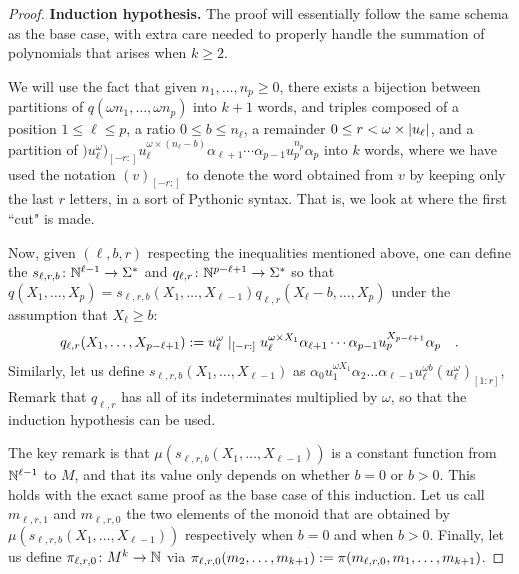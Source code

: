 \begin{proof}
    \textbf{Induction hypothesis.}
    The proof will essentially follow the same schema as the base case,
    with extra care needed to properly handle the summation of polynomials
    that arises when $k \geq 2$.

    We will use the fact that given $n_1, \dots, n_p \geq 0$,
    there exists a bijection between
    partitions of $q(\omega n_1, \dots, \omega n_p)$
    into $k+1$ words, and 
    triples composed of
    a position  $1 \leq \ell \leq p$,
    a ratio     $0 \leq b \leq n_\ell$,
    a remainder $0 \leq r < \omega \times \card{u_\ell}$,
    and a partition of
    $)u_\ell^\omega)_{[-r:]} u_\ell^{\omega \times (n_\ell - b)}
    \alpha_{\ell+1} \cdots \alpha_{p-1} u_p^{n_p} \alpha_{p}$
    into $k$ words,
    where we have used the notation 
    $(v)_{[-r:]}$ to denote the word obtained from $v$ 
    by keeping only the last $r$ letters, in a sort of Pythonic syntax.
    That is, we look at where the first ``cut" is made.

    Now, given $(\ell, b, r)$ respecting the inequalities 
    mentioned above,
    one can define the 
    $s_{\ell,r,b} \colon \mathbb{N}^{\ell - 1} \to \Sigma^*$
    and
    $q_{\ell,r} \colon \mathbb{N}^{p - \ell + 1} \to \Sigma^*$
    so that
    $q(X_1, \dots, X_p) = s_{\ell,r,b}(X_1, \dots, X_{\ell-1}) 
    q_{\ell, r}(X_{\ell} - b, \dots, X_p)$
    under the assumption that $X_\ell \geq b$:
    \begin{equation*}
        q_{\ell,r}(X_{1}, \dots, X_{p - \ell + 1})
        \mathrel{:=}
        u_\ell^\omega\mid_{[-r:]} u_\ell^{\omega \times X_1}
        \alpha_{\ell+1} \cdots \alpha_{p-1} u_p^{X_{p - \ell + 1}} \alpha_{p}
        \quad .
    \end{equation*}
    Similarly, let us define 
    $s_{\ell, r, b}(X_1, \dots, X_{\ell - 1})$
    as 
    $\alpha_0 u_1^{\omega X_1} \alpha_2 \dots \alpha_{\ell - 1} 
    u_\ell^{\omega b} (u_{\ell}^\omega)_{[1:r]}$,
    Remark that $q_{\ell,r}$ has all of its indeterminates
    multiplied by $\omega$, so that the induction hypothesis 
    can be used.

    The key remark is that $\mu(s_{\ell,r,b}(X_1, \dots, X_{\ell - 1}))$ is a
    constant function from $\mathbb{N}^{\ell-1}$ to $M$, and that its value
    only depends on whether $b = 0$ or $b > 0$.
    This holds with
    the exact same proof as the base case of this induction. Let us call
    $m_{\ell,r,1}$ and $m_{\ell,r,0}$ the two elements of the monoid that are
    obtained by $\mu(s_{\ell,r,b}(X_1, \dots, X_{\ell-1}))$ respectively when
    $b = 0$ and when $b > 0$. Finally, let us define $\pi_{\ell,r,0} \colon M^k
    \to \mathbb{N}$ via $\pi_{\ell,r,0}(m_2, \dots, m_{k+1}) \mathrel{:=}
    \pi(m_{\ell,r,0}, m_1, \dots, m_{k+1})$.


\end{proof}
